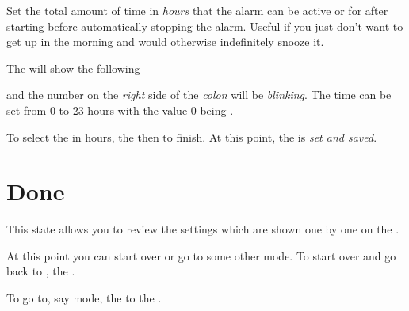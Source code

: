 Set the total amount of time in \textit{hours} that the alarm can be active or
 for after starting before automatically stopping the alarm.
Useful if you just don't want to get up in the morning and would otherwise
indefinitely snooze it.


The  will show the following


and the number on the \textit{right} side of the \textit{colon} will be
\textit{blinking}.  The time can be set from
\num{0} to \num{23} hours with the value \num{0} being .

\par\medskip

To select the  in hours,  the  then  to finish.
At this point, the  is \textit{set and saved}.


\section{Done} 

This state allows you to review the settings which are shown one by one on
the .

\par\medskip

At this point you can start over or go to some other mode.  To start over and
go back to ,  the .


To go to, say  mode,  the  to the .


